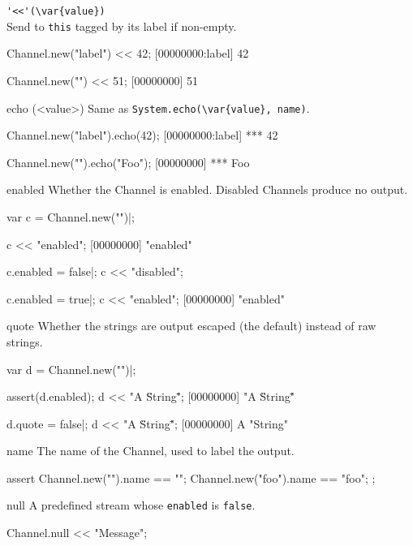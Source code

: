 \begin{urbiscriptapi}
\item \lstinline|'<<'(\var{value})|\\
  Send  to \lstinline|this| tagged by its label if non-empty.

\begin{urbiscript}
Channel.new("label") << 42;
[00000000:label] 42

Channel.new("") << 51;
[00000000] 51
\end{urbiscript}

\item[echo](<value>)%
  Same as \lstinline|System.echo(\var{value}, name)|.

\begin{urbiscript}
Channel.new("label").echo(42);
[00000000:label] *** 42

Channel.new("").echo("Foo");
[00000000] *** Foo
\end{urbiscript}

\item[enabled] Whether the Channel is enabled.  Disabled Channels
  produce no output.
\begin{urbiscript}
var c = Channel.new("")|;

c << "enabled";
[00000000] "enabled"

c.enabled = false|;
c << "disabled";

c.enabled = true|;
c << "enabled";
[00000000] "enabled"
\end{urbiscript}

\item[quote] Whether the strings are output escaped (the default)
  instead of raw strings.
\begin{urbiscript}
var d = Channel.new("")|;

assert(d.enabled);
d << "A \"String\"";
[00000000] "A \"String\""

d.quote = false|;
d << "A \"String\"";
[00000000] A "String"
\end{urbiscript}

\item[name] The name of the Channel, used to label the output.
\begin{urbiscript}
assert
{
  Channel.new("").name == "";
  Channel.new("foo").name == "foo";
};
\end{urbiscript}

\item[null] A predefined stream whose \lstinline|enabled| is
  \lstinline|false|.
\begin{urbiscript}
Channel.null << "Message";
\end{urbiscript}



\end{urbiscriptapi}
